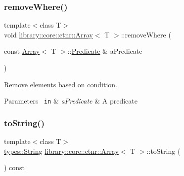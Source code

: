 \subsubsection{\texorpdfstring{removeWhere()}{removeWhere()}}
{\footnotesize\ttfamily template$<$class T$>$ \\
void \mbox{\hyperlink{classlibrary_1_1core_1_1ctnr_1_1_array}{library\+::core\+::ctnr\+::\+Array}}$<$ T $>$\+::remove\+Where (\begin{DoxyParamCaption}\item[{const \mbox{\hyperlink{classlibrary_1_1core_1_1ctnr_1_1_array}{Array}}$<$ T $>$\+::\mbox{\hyperlink{classlibrary_1_1core_1_1ctnr_1_1_array_a74cd325a740870aea490b6b739aa06ae}{Predicate}} \&}]{a\+Predicate }\end{DoxyParamCaption})}



Remove elements based on condition. 


\begin{DoxyCode}{0}
\end{DoxyCode}



\begin{DoxyParams}[1]{Parameters}
\mbox{\texttt{ in}}  & {\em a\+Predicate} & A predicate \\
\hline
\end{DoxyParams}
\mbox{\label{classlibrary_1_1core_1_1ctnr_1_1_array_a90622afd5860fedd7d04e6518c096ffa}} 
\subsubsection{\texorpdfstring{toString()}{toString()}}
{\footnotesize\ttfamily template$<$class T$>$ \\
\mbox{\hyperlink{classlibrary_1_1core_1_1types_1_1_string}{types\+::\+String}} \mbox{\hyperlink{classlibrary_1_1core_1_1ctnr_1_1_array}{library\+::core\+::ctnr\+::\+Array}}$<$ T $>$\+::to\+String (\begin{DoxyParamCaption}{ }\end{DoxyParamCaption}) const}



